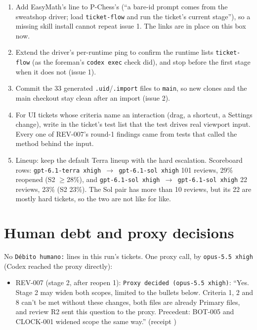 \documentclass[11pt,a4paper]{article}
\begin{document}
\begin{enumerate}
  \item Add EasyMath's line to P-Chess's  (``a bare-id prompt comes from the
        sweatshop driver; load \texttt{ticket-flow} and run the ticket's current stage''), so a
        missing skill install cannot repeat issue 1. The  links are in place
        on this box now.
  \item Extend the driver's per-runtime ping to confirm the runtime lists \texttt{ticket-flow} (as
        the foreman's \texttt{codex exec} check did), and stop before the first stage when it does
        not (issue 1).
  \item Commit the 33 generated \texttt{.uid}/\texttt{.import} files to \texttt{main}, so new clones
        and the main checkout stay clean after an import (issue 2).
  \item For UI tickets whose criteria name an interaction (drag, a shortcut, a Settings change),
        write in the ticket's test list that the test drives real viewport input. Every one of
        REV-007's round-1 findings came from tests that called the method behind the input.
  \item Lineup: keep the default Terra lineup with the hard escalation. Scoreboard rows:
        \texttt{gpt-6.1-terra xhigh $\rightarrow$ gpt-6.1-sol xhigh} 101 reviews, 29\% reopened
        (S2 $\geq$28\%), and \texttt{gpt-6.1-sol xhigh $\rightarrow$ gpt-6.1-sol xhigh} 22 reviews,
        23\% (S2 23\%). The Sol pair has more than 10 reviews, but its 22 are mostly hard tickets,
        so the two are not like for like.
\end{enumerate}

\section*{Human debt and proxy decisions}

No \texttt{Débito humano:} lines in this run's tickets. One proxy call, by
\texttt{opus-5.5 xhigh} (Codex reached the proxy directly):

\begin{itemize}
  \item REV-007 (stage 2, after reopen 1): \texttt{Proxy decided (opus-5.5 xhigh)}: ``Yes. Stage 2
        may widen both scopes, limited to the bullets below. Criteria 1, 2 and 8 can't be met
        without these changes, both files are already Primary files, and review R2 sent this
        question to the proxy. Precedent: BOT-005 and CLOCK-001 widened scope the same way.''
        (receipt )
\end{itemize}
\end{document}
